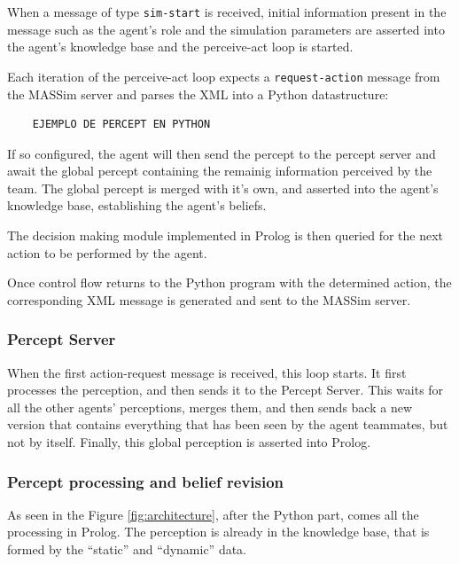     When a message of type \texttt{sim-start} is received, initial information
    present in the message such as the agent's role and the simulation
    parameters are asserted into the agent's knowledge base and the perceive-act
    loop is started.

    Each iteration of the perceive-act loop expects a \texttt{request-action}
    message from the MASSim server and parses the XML into a Python
    datastructure:

    \begin{verbatim}
    EJEMPLO DE PERCEPT EN PYTHON
    \end{verbatim}
    
    If so configured, the agent will then send the percept to the percept server
    and await the global percept containing the remainig information perceived
    by the team. The global percept is merged with it's own, and asserted into
    the agent's knowledge base, establishing the agent's beliefs.

    The decision making module implemented in Prolog is then queried for the
    next action to be performed by the agent.
    
    Once control flow returns to the Python program with the determined action,
    the corresponding XML message is generated and sent to the MASSim server. 


\subsubsection{Percept Server}
    When the first action-request message is received, this loop starts. It 
    first processes the perception, and then sends it to the Percept Server. 
    This waits for all the other agents' perceptions, merges them, and then sends 
    back a new version that contains everything that has been seen by the agent 
    teammates, but not by itself. Finally, this global perception is asserted 
    into Prolog. 


\subsubsection{Percept processing and belief revision}
    As seen in the Figure \ref{fig:architecture}, after the Python part, comes 
    all the processing in Prolog. The perception is already in the knowledge 
    base, that is formed by the ``static'' and ``dynamic'' data. 

